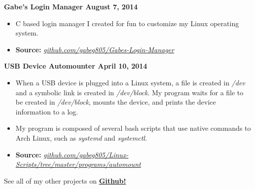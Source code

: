\documentclass[line]{resume}
\begin{document}
\begin{resume}
    \textbf{Gabe's Login Manager \hfill August 7, 2014}
    \vspace{1mm}
    \begin{itemize}
        \item C based login manager I created for fun to customize my Linux operating
          system.
        \item \textbf{Source: } \textsl{\href{http://github.com/gabeg805/Gabes-Login-Manager}{github.com/gabeg805/Gabes-Login-Manager}}
    \end{itemize}
    \vspace{-1mm} 
    
    \textbf{USB Device Automounter \hfill April 10, 2014}
    \vspace{1mm}
    \begin{itemize}
        \item When a USB device is plugged into a Linux system, a file is created in
        \textsl{/dev} and a symbolic link is created in \textsl{/dev/block}. My program waits for a
        file to be created in \textsl{/dev/block}, mounts the device, and prints the device
        information to a log.
        \item My program is composed of several bash scripts that use native commands to Arch Linux, such as \textsl{systemd} and \textsl{systemctl}. 
        \item \textbf{Source: } \textsl{\href{http://github.com/gabeg805/Linux-Scripts/tree/master/programs/automount}{github.com/gabeg805/Linux-Scripts/tree/master/programs/automount}}
    \end{itemize}
    \vspace{-1mm}
    
    See all of my other projects on \textbf{{\href{http://github.com/gabeg805}{Github!}}}
    
    
    
    
    
    
    
    

\end{resume}
\end{document}
